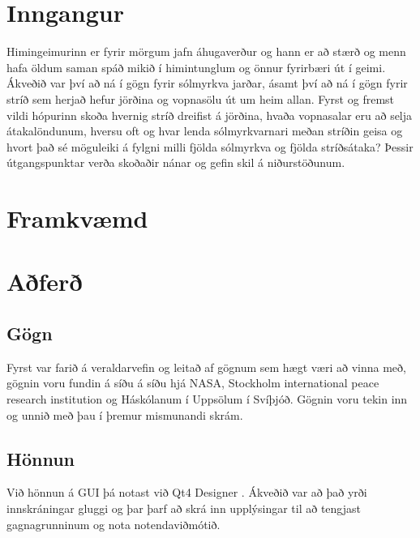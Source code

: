 \documentclass[12pt, git, final]{rureport}
\begin{document}
\maketitle  %


%
\section{Inngangur} %
Himingeimurinn er fyrir mörgum jafn áhugaverður og hann er að stærð og menn hafa öldum saman spáð mikið í himintunglum og önnur fyrirbæri út í geimi. Ákveðið var því að ná í gögn fyrir sólmyrkva jarðar, ásamt því að ná í gögn fyrir stríð  sem herjað hefur jörðina og vopnasölu út um heim allan. Fyrst og fremst vildi hópurinn skoða hvernig stríð dreifist á jörðina, hvaða vopnasalar eru að selja átakalöndunum, hversu oft og hvar lenda sólmyrkvarnari meðan stríðin geisa og hvort það sé möguleiki á fylgni milli fjölda sólmyrkva og fjölda stríðsátaka? Þessir útgangspunktar verða skoðaðir nánar og gefin skil á niðurstöðunum. 
\section{Framkvæmd}

\section{Aðferð}
\subsection{Gögn}
Fyrst var farið á veraldarvefin og leitað af gögnum sem hægt væri að vinna með, gögnin voru fundin á síðu á síðu hjá NASA\cite{Eclipse}, Stockholm international peace research institution\cite{weapon} og Háskólanum í Uppsölum í Svíþjóð\cite{conflict}. Gögnin voru tekin inn og unnið með þau í þremur mismunandi skrám.
\subsection{Hönnun}
Við hönnun á GUI þá notast  við Qt4 Designer \cite{qt4}. Ákveðið var að það yrði innskráningar gluggi og þar þarf að skrá inn upplýsingar til að tengjast gagnagrunninum og nota notendaviðmótið.
\end{document}
